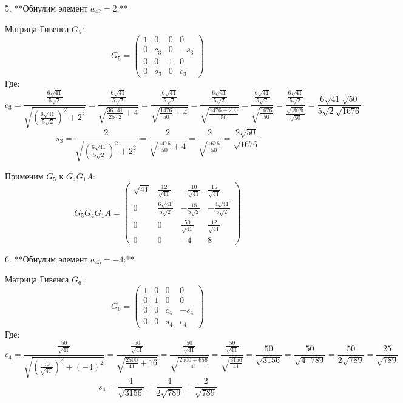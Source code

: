 \documentclass[a4paper,14pt]{article}
\begin{document}
5. **Обнулим элемент \( a_{42} = 2 \):**

   Матрица Гивенса \( G_5 \):
   \[
   G_5 = \begin{pmatrix}
   1 & 0 & 0 & 0 \\
   0 & c_3 & 0 & -s_3 \\
   0 & 0 & 1 & 0 \\
   0 & s_3 & 0 & c_3
   \end{pmatrix}
   \]
   Где:
   \[
   c_3 = \frac{\frac{6 \sqrt{41}}{5 \sqrt{2}}}{\sqrt{\left(\frac{6 \sqrt{41}}{5 \sqrt{2}}\right)^2 + 2^2}} = \frac{\frac{6 \sqrt{41}}{5 \sqrt{2}}}{\sqrt{\frac{36 \cdot 41}{25 \cdot 2} + 4}} = \frac{\frac{6 \sqrt{41}}{5 \sqrt{2}}}{\sqrt{\frac{1476}{50} + 4}} = \frac{\frac{6 \sqrt{41}}{5 \sqrt{2}}}{\sqrt{\frac{1476 + 200}{50}}} = \frac{\frac{6 \sqrt{41}}{5 \sqrt{2}}}{\sqrt{\frac{1676}{50}}} = \frac{\frac{6 \sqrt{41}}{5 \sqrt{2}}}{\frac{\sqrt{1676}}{\sqrt{50}}} = \frac{6 \sqrt{41} \sqrt{50}}{5 \sqrt{2} \sqrt{1676}}
   \]
   \[
   s_3 = \frac{2}{\sqrt{\left(\frac{6 \sqrt{41}}{5 \sqrt{2}}\right)^2 + 2^2}} = \frac{2}{\sqrt{\frac{1476}{50} + 4}} = \frac{2}{\sqrt{\frac{1676}{50}}} = \frac{2 \sqrt{50}}{\sqrt{1676}}
   \]

   Применим \( G_5 \) к \( G_4 G_1 A \):
   \[
   G_5 G_4 G_1 A = \begin{pmatrix}
   \sqrt{41} & \frac{12}{\sqrt{41}} & -\frac{10}{\sqrt{41}} & \frac{15}{\sqrt{41}} \\
   0 & \frac{6 \sqrt{41}}{5 \sqrt{2}} & -\frac{18}{5 \sqrt{2}} & -\frac{4 \sqrt{41}}{5 \sqrt{2}} \\
   0 & 0 & \frac{50}{\sqrt{41}} & \frac{12}{\sqrt{41}} \\
   0 & 0 & -4 & 8
   \end{pmatrix}
   \]

6. **Обнулим элемент \( a_{43} = -4 \):**

   Матрица Гивенса \( G_6 \):
   \[
   G_6 = \begin{pmatrix}
   1 & 0 & 0 & 0 \\
   0 & 1 & 0 & 0 \\
   0 & 0 & c_4 & -s_4 \\
   0 & 0 & s_4 & c_4
   \end{pmatrix}
   \]
   Где:
   \[
   c_4 = \frac{\frac{50}{\sqrt{41}}}{\sqrt{\left(\frac{50}{\sqrt{41}}\right)^2 + (-4)^2}} = \frac{\frac{50}{\sqrt{41}}}{\sqrt{\frac{2500}{41} + 16}} = \frac{\frac{50}{\sqrt{41}}}{\sqrt{\frac{2500 + 656}{41}}} = \frac{\frac{50}{\sqrt{41}}}{\sqrt{\frac{3156}{41}}} = \frac{50}{\sqrt{3156}} = \frac{50}{\sqrt{4 \cdot 789}} = \frac{50}{2 \sqrt{789}} = \frac{25}{\sqrt{789}}
   \]
   \[
   s_4 = \frac{4}{\sqrt{3156}} = \frac{4}{2 \sqrt{789}} = \frac{2}{\sqrt{789}}
   \]
\end{document}
